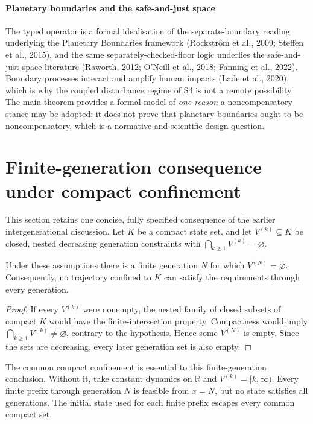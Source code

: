 \paragraph{Planetary boundaries and the safe-and-just space} The typed operator is a formal idealisation of the separate-boundary reading underlying the Planetary Boundaries framework (Rockstr\"om et al., 2009; Steffen et al., 2015), and the same separately-checked-floor logic underlies the safe-and-just-space literature (Raworth, 2012; O'Neill et al., 2018; Fanning et al., 2022). Boundary processes interact and amplify human impacts (Lade et al., 2020), which is why the coupled disturbance regime of S4 is not a remote possibility. The main theorem provides a formal model of \emph{one reason} a noncompensatory stance may be adopted; it does not prove that planetary boundaries ought to be noncompensatory, which is a normative and scientific-design question.

\section{Finite-generation consequence under compact confinement}\label{si:finitegeneration}

This section retains one concise, fully specified consequence of the earlier intergenerational discussion. Let $K$ be a compact state set, and let $V^{(k)}\subseteq K$ be closed, nested decreasing generation constraints with $\bigcap_{k\ge1}V^{(k)}=\varnothing$.

\begin{proposition}\label{prop:finitegeneration}
Under these assumptions there is a finite generation $N$ for which $V^{(N)}=\varnothing$. Consequently, no trajectory confined to $K$ can satisfy the requirements through every generation.
\end{proposition}
\begin{proof}
If every $V^{(k)}$ were nonempty, the nested family of closed subsets of compact $K$ would have the finite-intersection property. Compactness would imply $\bigcap_{k\ge1}V^{(k)}\ne\varnothing$, contrary to the hypothesis. Hence some $V^{(N)}$ is empty. Since the sets are decreasing, every later generation set is also empty.
\end{proof}

The common compact confinement is essential to this finite-generation conclusion. Without it, take constant dynamics on $\mathbb R$ and $V^{(k)}=[k,\infty)$. Every finite prefix through generation $N$ is feasible from $x=N$, but no state satisfies all generations. The initial state used for each finite prefix escapes every common compact set.

